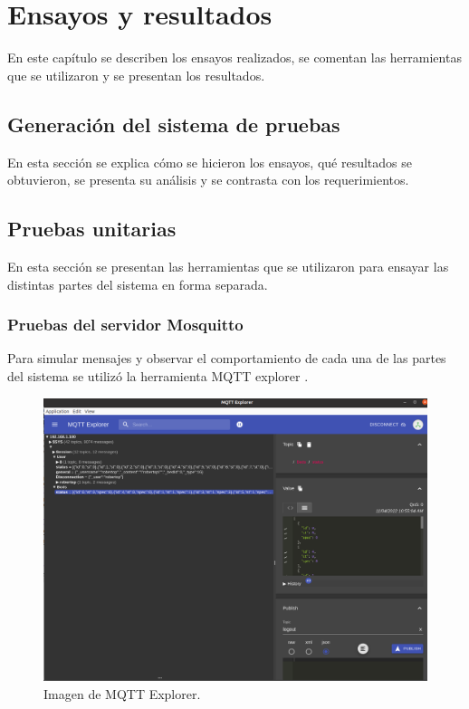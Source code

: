 
\chapter{Ensayos y resultados} %

En este capítulo se describen los ensayos realizados, se comentan las herramientas que se utilizaron y se presentan los resultados.

\label{Chapter4} %


\section{Generación del sistema de pruebas}
\label{sec:pruebasHW}

En esta sección se explica cómo se hicieron los ensayos, qué resultados se obtuvieron, se presenta su análisis y se contrasta con los requerimientos.

\section{Pruebas unitarias}
En esta sección se presentan las herramientas que se utilizaron para ensayar las distintas partes del sistema en forma separada.

\subsection{Pruebas del servidor Mosquitto}
Para simular mensajes y observar el comportamiento de cada una de las partes del sistema se utilizó la herramienta MQTT explorer   \citep{WEBSITE:29}.

\begin{figure}[ht]
	\centering
	\includegraphics[scale=.25]{./Figures/mqtt-explorer.png}
	\caption{Imagen de MQTT Explorer.}
	\label{fig:MQTT Explorer}
\end{figure}

